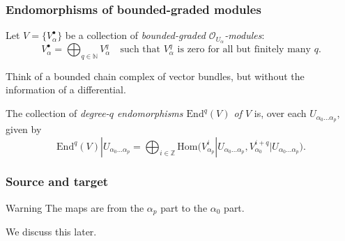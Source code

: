 \documentclass{beamer}
\begin{document}
            \begin{frame}\frametitle{Endomorphisms of bounded-graded modules}
                Let $V=\{V_\alpha^\bullet\}$ be a collection of \emph{bounded-graded $\mathcal{O}_{U_\alpha}$-modules}:
                \begin{equation*}
                    V_\alpha^\bullet = \bigoplus_{q\in\mathbb{N}}V_\alpha^q\quad\text{such that }V_\alpha^q\text{ is zero for all but finitely many }q.
                \end{equation*}

                \pause

                Think of a bounded chain complex of vector bundles, but without the information of a differential.

                \pause

                \begin{definition}[Endomorphisms]
                    The collection of \emph{degree-$q$ endomorphisms $\mathrm{End}^q(V)$ of $V$} is, over each $U_{\alpha_0\ldots\alpha_p}$, given by
                    \begin{equation*}
                        \mathrm{End}^q(V)|U_{\alpha_0\ldots\alpha_p} = \bigoplus_{i\in\mathbb{Z}}\mathrm{Hom}\big( V_{\alpha_p}^i|U_{\alpha_0\ldots\alpha_p}, V_{\alpha_0}^{i+q}|U_{\alpha_0\ldots\alpha_p} \big).
                    \end{equation*}
                \end{definition}
            \end{frame}

            \begin{frame}\frametitle{Source and target}
                \begin{alertblock}{Warning}
                    The maps are from the $\alpha_p$ part to the $\alpha_0$ part.
                \end{alertblock}

                \pause

                We discuss this later.
            \end{frame}
\end{document}
